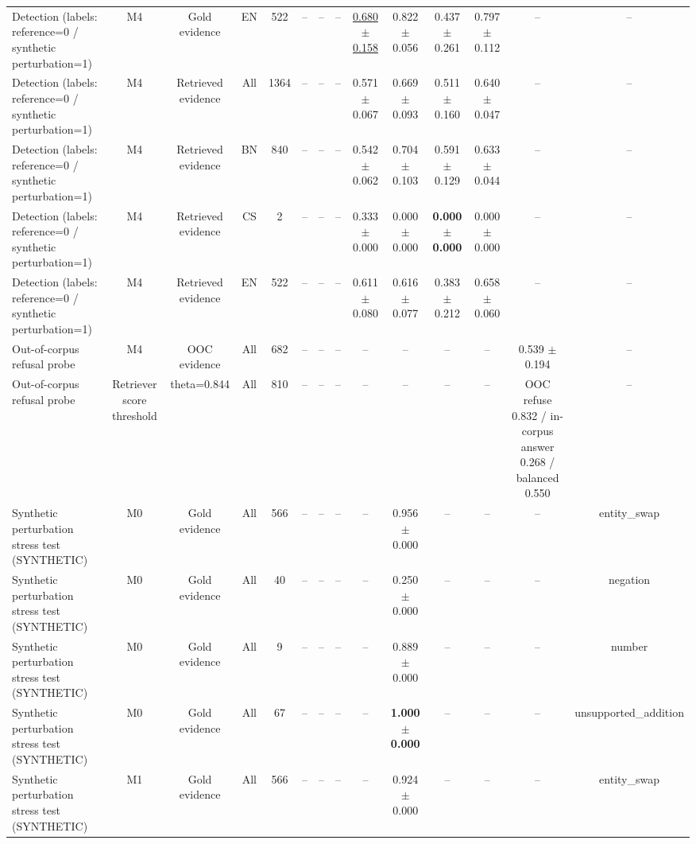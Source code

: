 \begin{table}[t]
{\begin{tabular}{lccccccccccccc}
Detection (labels: reference=0 / synthetic perturbation=1) & M4 & Gold evidence & EN & 522 & -- & -- & -- & \underline{0.680 $\pm$ 0.158} & 0.822 $\pm$ 0.056 & 0.437 $\pm$ 0.261 & 0.797 $\pm$ 0.112 & -- & -- \\
Detection (labels: reference=0 / synthetic perturbation=1) & M4 & Retrieved evidence & All & 1364 & -- & -- & -- & 0.571 $\pm$ 0.067 & 0.669 $\pm$ 0.093 & 0.511 $\pm$ 0.160 & 0.640 $\pm$ 0.047 & -- & -- \\
Detection (labels: reference=0 / synthetic perturbation=1) & M4 & Retrieved evidence & BN & 840 & -- & -- & -- & 0.542 $\pm$ 0.062 & 0.704 $\pm$ 0.103 & 0.591 $\pm$ 0.129 & 0.633 $\pm$ 0.044 & -- & -- \\
Detection (labels: reference=0 / synthetic perturbation=1) & M4 & Retrieved evidence & CS & 2 & -- & -- & -- & 0.333 $\pm$ 0.000 & 0.000 $\pm$ 0.000 & \textbf{0.000 $\pm$ 0.000} & 0.000 $\pm$ 0.000 & -- & -- \\
Detection (labels: reference=0 / synthetic perturbation=1) & M4 & Retrieved evidence & EN & 522 & -- & -- & -- & 0.611 $\pm$ 0.080 & 0.616 $\pm$ 0.077 & 0.383 $\pm$ 0.212 & 0.658 $\pm$ 0.060 & -- & -- \\
\midrule
Out-of-corpus refusal probe & M4 & OOC evidence & All & 682 & -- & -- & -- & -- & -- & -- & -- & 0.539 $\pm$ 0.194 & -- \\
Out-of-corpus refusal probe & Retriever score threshold & theta=0.844 & All & 810 & -- & -- & -- & -- & -- & -- & -- & OOC refuse 0.832 / in-corpus answer 0.268 / balanced 0.550 & -- \\
\midrule
Synthetic perturbation stress test (SYNTHETIC) & M0 & Gold evidence & All & 566 & -- & -- & -- & -- & 0.956 $\pm$ 0.000 & -- & -- & -- & entity\_swap \\
Synthetic perturbation stress test (SYNTHETIC) & M0 & Gold evidence & All & 40 & -- & -- & -- & -- & 0.250 $\pm$ 0.000 & -- & -- & -- & negation \\
Synthetic perturbation stress test (SYNTHETIC) & M0 & Gold evidence & All & 9 & -- & -- & -- & -- & 0.889 $\pm$ 0.000 & -- & -- & -- & number \\
Synthetic perturbation stress test (SYNTHETIC) & M0 & Gold evidence & All & 67 & -- & -- & -- & -- & \textbf{1.000 $\pm$ 0.000} & -- & -- & -- & unsupported\_addition \\
Synthetic perturbation stress test (SYNTHETIC) & M1 & Gold evidence & All & 566 & -- & -- & -- & -- & 0.924 $\pm$ 0.000 & -- & -- & -- & entity\_swap \\

\end{tabular}}
\end{table}
